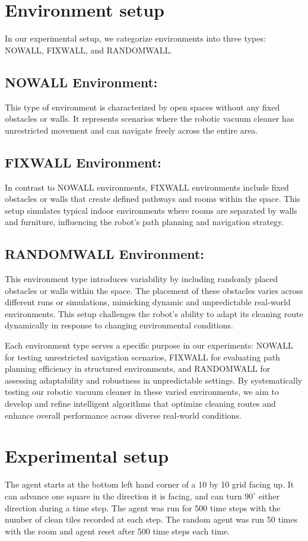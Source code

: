 \documentclass{article}
\begin{document}
\section{Environment setup}

In our experimental setup, we categorize environments into three types: NOWALL, FIXWALL, and RANDOMWALL.

\subsection{NOWALL Environment:} This type of environment is characterized by open spaces without any fixed obstacles or walls. It represents scenarios where the robotic vacuum cleaner has unrestricted movement and can navigate freely across the entire area.

\subsection{FIXWALL Environment:} In contrast to NOWALL environments, FIXWALL environments include fixed obstacles or walls that create defined pathways and rooms within the space. This setup simulates typical indoor environments where rooms are separated by walls and furniture, influencing the robot's path planning and navigation strategy.

\subsection{RANDOMWALL Environment:} This environment type introduces variability by including randomly placed obstacles or walls within the space. The placement of these obstacles varies across different runs or simulations, mimicking dynamic and unpredictable real-world environments. This setup challenges the robot's ability to adapt its cleaning route dynamically in response to changing environmental conditions.


Each environment type serves a specific purpose in our experiments: NOWALL for testing unrestricted navigation scenarios, FIXWALL for evaluating path planning efficiency in structured environments, and RANDOMWALL for assessing adaptability and robustness in unpredictable settings. By systematically testing our robotic vacuum cleaner in these varied environments, we aim to develop and refine intelligent algorithms that optimize cleaning routes and enhance overall performance across diverse real-world conditions.

\section{Experimental setup}
The agent starts at the bottom left hand corner of a 10 by 10 grid facing up. It can advance one square in the direction it is facing, and can turn $90^\circ$ either direction during a time step. The agent was run for 500 time steps with the number of clean tiles recorded at each step. The random agent was run 50 times with the room and agent reset after 500 time steps each time.
\end{document}

